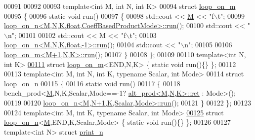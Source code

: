 \begin{DoxyCode}
00091 
00092 
00093 \textcolor{keyword}{template}<\textcolor{keywordtype}{int} M, \textcolor{keywordtype}{int} N, \textcolor{keywordtype}{int} K>
00094 \textcolor{keyword}{struct }\hyperlink{structloop__on__m}{loop\_on\_m}
00095 \{
00096   \textcolor{keyword}{static} \textcolor{keywordtype}{void} run()
00097   \{
00098     std::cout << \hyperlink{group___core___module_class_eigen_1_1_matrix}{M} << \textcolor{stringliteral}{"f\(\backslash\)t"};
00099     \hyperlink{structloop__on__n}{loop\_on\_n<M,N,K,float,CoeffBasedProductMode>::run}();
00100     std::cout << \textcolor{stringliteral}{"\(\backslash\)n"};
00101     
00102     std::cout << M << \textcolor{stringliteral}{"f\(\backslash\)t"};
00103     \hyperlink{structloop__on__n}{loop\_on\_n<M,N,K,float,-1>::run}();
00104     std::cout << \textcolor{stringliteral}{"\(\backslash\)n"};
00105 
00106     \hyperlink{structloop__on__m}{loop\_on\_m<M+1,N,K>::run}();
00107   \}
00108 \};
00109 
00110 \textcolor{keyword}{template}<\textcolor{keywordtype}{int} N, \textcolor{keywordtype}{int} K>
\hyperlink{structloop__on__m_3_01_e_n_d_00_01_n_00_01_k_01_4}{00111} \textcolor{keyword}{struct }\hyperlink{structloop__on__m}{loop\_on\_m}<END,N,K> \{ \textcolor{keyword}{static} \textcolor{keywordtype}{void} run()\{\} \};
00112 
00113 \textcolor{keyword}{template}<\textcolor{keywordtype}{int} M, \textcolor{keywordtype}{int} N, \textcolor{keywordtype}{int} K, \textcolor{keyword}{typename} Scalar, \textcolor{keywordtype}{int} Mode>
00114 \textcolor{keyword}{struct }\hyperlink{structloop__on__n}{loop\_on\_n}
00115 \{
00116   \textcolor{keyword}{static} \textcolor{keywordtype}{void} run()
00117   \{
00118     bench\_prod<\hyperlink{group___core___module_class_eigen_1_1_matrix}{M},N,K,Scalar,Mode==-1? \hyperlink{structalt__prod}{alt\_prod<M,N,K>::ret} : Mode>();
00119     
00120     \hyperlink{structloop__on__n}{loop\_on\_n<M,N+1,K,Scalar,Mode>::run}();
00121   \}
00122 \};
00123 
00124 \textcolor{keyword}{template}<\textcolor{keywordtype}{int} M, \textcolor{keywordtype}{int} K, \textcolor{keyword}{typename} Scalar, \textcolor{keywordtype}{int} Mode>
\hyperlink{structloop__on__n_3_01_m_00_01_e_n_d_00_01_k_00_01_scalar_00_01_mode_01_4}{00125} \textcolor{keyword}{struct }\hyperlink{structloop__on__n}{loop\_on\_n}<\hyperlink{group___core___module_class_eigen_1_1_matrix}{M},END,K,Scalar,Mode> \{ \textcolor{keyword}{static} \textcolor{keywordtype}{void} run()\{\} \};
00126 
00127 \textcolor{keyword}{template}<\textcolor{keywordtype}{int} N> \textcolor{keyword}{struct }\hyperlink{structprint__n}{print\_n}

\end{DoxyCode}

